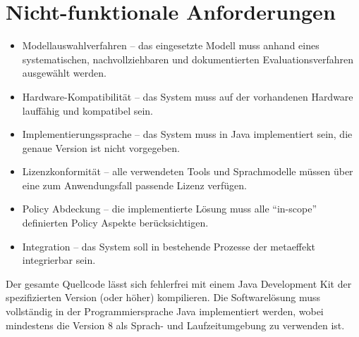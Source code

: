 \section{Nicht-funktionale Anforderungen}\label{sec:nicht-funktionale-anforderungen}

\begin{itemize}
    \item Modellauswahlverfahren -- das eingesetzte Modell muss anhand eines systematischen, nachvollziehbaren und dokumentierten Evaluationsverfahren ausgewählt werden.
    \item Hardware-Kompatibilität -- das System muss auf der vorhandenen Hardware lauffähig und kompatibel sein.
    \item Implementierungssprache -- das System muss in Java implementiert sein, die genaue Version ist nicht vorgegeben.
    \item Lizenzkonformität -- alle verwendeten Tools und Sprachmodelle müssen über eine zum Anwendungsfall passende Lizenz verfügen.
    \item Policy Abdeckung -- die implementierte Lösung muss alle \enquote{in-scope} definierten Policy Aspekte berücksichtigen.
    \item Integration -- das System soll in bestehende Prozesse der metaeffekt integrierbar sein.
\end{itemize}


\begin{anforderungsliste}
        {Der gesamte Quellcode lässt sich fehlerfrei mit einem Java Development Kit der spezifizierten Version (oder höher) kompilieren.}
        {Die Softwarelösung muss vollständig in der Programmiersprache Java implementiert werden, wobei mindestens die Version 8 als Sprach- und Laufzeitumgebung zu verwenden ist.}
\end{anforderungsliste}
